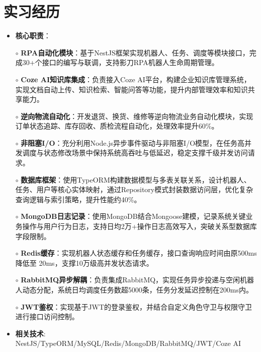 \section{实习经历}
    \begin{normalsize}
      \begin{itemize}
        \item \textbf{核心职责}：
        \setlength{\itemindent}{1em} %
          \item[$\circ$] \textbf{RPA自动化模块}：基于NestJS框架实现机器人、任务、调度等模块接口，完成30+个接口的编写与联调，支持影刀RPA机器人生命周期管理。
          \item[$\circ$] \textbf{Coze AI知识库集成}：负责接入Coze AI平台，构建企业知识库管理系统，实现文档自动上传、知识检索、智能问答等功能，提升内部管理效率和知识共享能力。
          \item[$\circ$] \textbf{逆向物流自动化}：开发退货、换货、维修等逆向物流业务自动化模块，实现订单状态追踪、库存回收、质检流程自动化，处理效率提升60\%。
          \item[$\circ$] \textbf{非阻塞I/O}：充分利用Node.js异步事件驱动与非阻塞I/O模型，在任务高并发调度与状态修改场景中保持系统高吞吐与低延迟，稳定支撑千级并发访问请求。
          \item[$\circ$] \textbf{数据库框架}：使用TypeORM构建数据模型与多表关联关系，设计机器人、任务、用户等核心实体映射，通过Repository模式封装数据访问层，优化复杂查询逻辑与索引策略，提升性能约40\%。
          \item[$\circ$] \textbf{MongoDB日志记录}：使用MongoDB结合Mongoose建模，记录系统关键业务操作与用户行为日志，支持日均2万+操作日志高效写入，突破关系型数据库字段限制。
          \item[$\circ$] \textbf{Redis缓存}：实现机器人状态缓存和任务缓存，接口查询响应时间由原500ms降低至 20ms，支撑10万级高并发状态请求。
          \item[$\circ$] \textbf{RabbitMQ异步解耦​​}：负责集成RabbitMQ，实现任务异步投递与空闲机器人动态分配，系统日均调度任务数超5000条，任务分发延迟控制在200ms内。
          \item[$\circ$] \textbf{JWT鉴权}：实现基于JWT的登录鉴权，并结合自定义角色守卫与权限守卫进行接口访问控制。
        \setlength{\itemindent}{0em} %
        \item \textbf{相关技术}: NestJS/TypeORM/MySQL/Redis/MongoDB/RabbitMQ/JWT/Coze AI
        \end{itemize}
    \end{normalsize}
